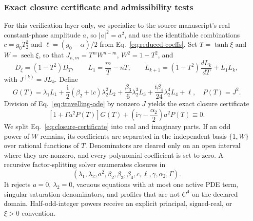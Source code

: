 \documentclass[11pt]{article}
\newcommand{\ii}{\mathrm{i}}
\newcommand{\sech}{\operatorname{sech}}
\begin{document}
\subsubsection{Exact closure certificate and admissibility tests}

For this verification layer only, we specialize to the source manuscript's
real constant-phase amplitude $a$, so $|a|^2=a^2$, and use the identifiable
combinations $c=g_0T_2^2$ and $\ell=(g_0-\alpha)/2$ from
Eq.~\eqref{eq:reduced-coeffs}.  Set $T=\tanh\xi$ and $W=\sech\xi$, so that
$J_{n,m}=T^mW^{n-m}$, $W^2=1-T^2$, and
\begin{equation}
D_\xi=(1-T^2)D_T,\qquad L_1=\frac{m}{T}-nT,\qquad
L_{k+1}=(1-T^2)\frac{dL_k}{dT}+L_1L_k,
\label{eq:log-derivative}
\end{equation}
with $J^{(k)}=JL_k$.  Define
\begin{equation}
G(T)=\lambda_1L_1+\frac{\ii}{2}(\beta_2+\ii c)\lambda_2^2L_2
+\frac{\beta_3}{6}\lambda_2^3L_3
+\frac{\ii\beta_4}{24}\lambda_2^4L_4+\ell,
\quad P(T)=J^2.
\end{equation}
Division of Eq.~\eqref{eq:travelling-ode} by nonzero $J$ yields the exact
closure certificate
\begin{equation}
\label{eq:closure-certificate}
[1+\Gamma a^2P(T)]G(T)
+\left(\ii\gamma-\frac{\alpha_2}{2}\right)a^2P(T)\equiv0.
\end{equation}
We split Eq.~\eqref{eq:closure-certificate} into real and imaginary parts.  If
an odd power of $W$ remains, its coefficients are separated in the independent
basis $\{1,W\}$ over rational functions of $T$.  Denominators are cleared only
on an open interval where they are nonzero, and every polynomial coefficient
is set to zero.  A recursive factor-splitting solver enumerates closures in
\begin{equation}
(\lambda_1,\lambda_2,a^2,\beta_2,\beta_3,\beta_4,c,\ell,
\gamma,\alpha_2,\Gamma).
\end{equation}
It rejects $a=0$, $\lambda_2=0$, vacuous equations with at most one active PDE
term, singular saturation denominators, and profiles that are not $C^4$ on
the declared domain.  Half-odd-integer powers receive an explicit principal,
signed-real, or $\xi>0$ convention.
\end{document}
